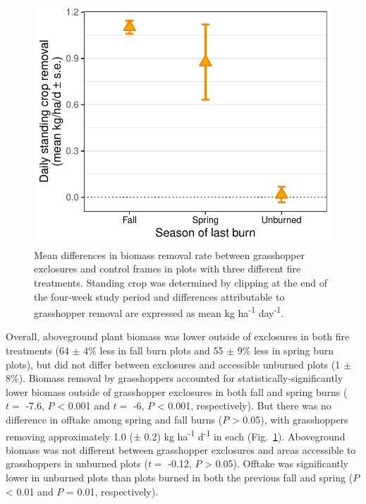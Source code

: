 \documentclass[referee, 
	            sn-basic]
           {sn-jnl}
\begin{document}
\begin{linenumbers}
\begin{figure}
\centering
\includegraphics{removal_gg-1.pdf}
\caption{Mean differences in biomass removal rate between grasshopper exclosures and control frames in plots with three different fire treatments. 
Standing crop was determined by clipping at the end of the four-week study period and differences attributable to grasshopper removal are expressed as mean kg ha\textsuperscript{-1} day\textsuperscript{-1}.}
\label{removal} %
\end{figure}

Overall, aboveground plant biomass was lower outside of exclosures in both fire treatments (64 $\pm$ 4\% less in fall burn plots and 55 $\pm$ 9\% less in spring burn plots), but did not differ between exclosures and accessible unburned plots (1 $\pm$ 8\%).
Biomass removal by grasshoppers accounted for statistically-significantly lower biomass outside of grasshopper exclosures in both fall and spring burns (\(t =\) -7.6,
\(P\) \textless{} 0.001 and \(t =\) -6, \(P\) \textless{} 0.001, respectively).
But there was no difference in offtake among spring and fall burns (\(P\) \textgreater{} 0.05), with grasshoppers removing approximately 1.0 ($\pm$ 0.2) kg ha\textsuperscript{-1} d\textsuperscript{-1} in each (Fig.~\ref{removal}). 
Aboveground biomass was not different between grasshopper exclosures and areas accessible to grasshoppers in unburned plots (\(t =\) -0.12, \(P\) \textgreater{} 0.05).
 Offtake was significantly lower in unburned plots than plots burned in both the previous fall and spring (\(P\) \textless{} 0.01 and \(P\) = 0.01, respectively).


\end{linenumbers}
\end{document}
